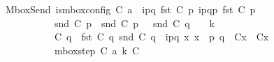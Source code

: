 \begin{isabellebody}
\ \ MboxSend{\isacharcolon}{\kern0pt}\ {\isachardoublequoteopen}{\isasymlbrakk}is{\isacharunderscore}{\kern0pt}mbox{\isacharunderscore}{\kern0pt}config\ C{}{\isacharsemicolon}{\kern0pt}\ a\ {\isacharequal}{\kern0pt}\ {\isacharbang}{\kern0pt}{\isasymlangle}{\isacharparenleft}{\kern0pt}i\isactrlbsup p{\isasymrightarrow}q\isactrlesup {\isacharparenright}{\kern0pt}{\isasymrangle}{\isacharsemicolon}{\kern0pt}\ fst\ {\isacharparenleft}{\kern0pt}C{}\ p{\isacharparenright}{\kern0pt}\ {\isasymmidarrow}{\isacharbang}{\kern0pt}{\isasymlangle}{\isacharparenleft}{\kern0pt}i\isactrlbsup p{\isasymrightarrow}q\isactrlesup {\isacharparenright}{\kern0pt}{\isasymrangle}{\isasymrightarrow}\isactrlsub {\isasymC}p\ {\isacharparenleft}{\kern0pt}fst\ {\isacharparenleft}{\kern0pt}C{}\ p{\isacharparenright}{\kern0pt}{\isacharparenright}{\kern0pt}{\isacharsemicolon}{\kern0pt}\isanewline
\ \ \ \ \ \ \ \ \ \ \ \ snd\ {\isacharparenleft}{\kern0pt}C{}\ p{\isacharparenright}{\kern0pt}\ {\isacharequal}{\kern0pt}\ snd\ {\isacharparenleft}{\kern0pt}C{}\ p{\isacharparenright}{\kern0pt}{\isacharsemicolon}{\kern0pt}\ {\isacharparenleft}{\kern0pt}\ {\isacharbar}{\kern0pt}\ {\isacharparenleft}{\kern0pt}snd\ {\isacharparenleft}{\kern0pt}C{}\ q{\isacharparenright}{\kern0pt}{\isacharparenright}{\kern0pt}\ {\isacharbar}{\kern0pt}\ {\isacharparenright}{\kern0pt}\ {\isacharless}{\kern0pt}\isactrlsub {\isasymB}\ k{\isacharsemicolon}{\kern0pt}\isanewline
\ \ \ \ \ \ \ \ \ \ \ \ C{}\ q\ {\isacharequal}{\kern0pt}\ {\isacharparenleft}{\kern0pt}fst\ {\isacharparenleft}{\kern0pt}C{}\ q{\isacharparenright}{\kern0pt}{\isacharcomma}{\kern0pt}\ {\isacharparenleft}{\kern0pt}snd\ {\isacharparenleft}{\kern0pt}C{}\ q{\isacharparenright}{\kern0pt}{\isacharparenright}{\kern0pt}\ {\isasymsqdot}\ {\isacharbrackleft}{\kern0pt}{\isacharparenleft}{\kern0pt}i\isactrlbsup p{\isasymrightarrow}q\isactrlesup {\isacharparenright}{\kern0pt}{\isacharbrackright}{\kern0pt}{\isacharparenright}{\kern0pt}{\isacharsemicolon}{\kern0pt}\ {\isasymforall}x{\isachardot}{\kern0pt}\ x\ {\isasymnotin}\ {\isacharbraceleft}{\kern0pt}p{\isacharcomma}{\kern0pt}\ q{\isacharbraceright}{\kern0pt}\ {\isasymlongrightarrow}\ C{}{\isacharparenleft}{\kern0pt}x{\isacharparenright}{\kern0pt}\ {\isacharequal}{\kern0pt}\ C{}{\isacharparenleft}{\kern0pt}x{\isacharparenright}{\kern0pt}{\isasymrbrakk}\ {\isasymLongrightarrow}\isanewline
\ \ \ \ \ \ \ \ \ \ \ \ mbox{\isacharunderscore}{\kern0pt}step\ C{}\ a\ k\ C{}{\isachardoublequoteclose}\ {\isacharbar}{\kern0pt}\isanewline

\end{isabellebody}
